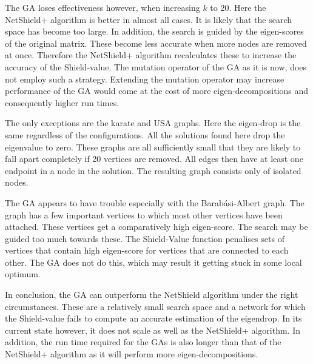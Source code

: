 \documentclass[11pt]{article}
\theoremstyle{definition}
\begin{document}
The GA loses effectiveness however, when increasing $k$ to 20. Here the NetShield+ algorithm is better in almost all cases. It is likely that the search space has become too large. In addition, the search is guided by the eigen-scores of the original matrix. These become less accurate when more nodes are removed at once. Therefore the NetShield+ algorithm recalculates these to increase the accuracy of the Shield-value. The mutation operator of the GA as it is now, does not employ such a strategy. Extending the mutation operator may increase performance of the GA would come at the cost of more eigen-decompositions and consequently higher run times.

The only exceptions are the karate and USA graphs. Here the eigen-drop is the same regardless of the configurations. All the solutions found here drop the eigenvalue to zero. These graphs are all sufficiently small that they are likely to fall apart completely if 20 vertices are removed. All edges then have at least one endpoint in a node in the solution. The resulting graph consists only of isolated nodes.

The GA appears to have trouble especially with the Barab\'asi-Albert graph. The graph has a few important vertices to which most other vertices have been attached. These vertices get a comparatively high eigen-score. The search may be guided too much towards these. The Shield-Value function penalises sets of vertices that contain high eigen-score for vertices that are connected to each other. The GA does not do this, which may result it getting stuck in some local optimum. 

In conclusion, the GA can outperform the NetShield algorithm under the right circumstances. These are a relatively small search space and a network for which the Shield-value fails to compute an accurate estimation of the eigendrop. In its current state however, it does not scale as well as the NetShield+ algorithm. In addition, the run time required for the GAs is also longer than that of the NetShield+ algorithm as it will perform more eigen-decompositions.
\end{document}
